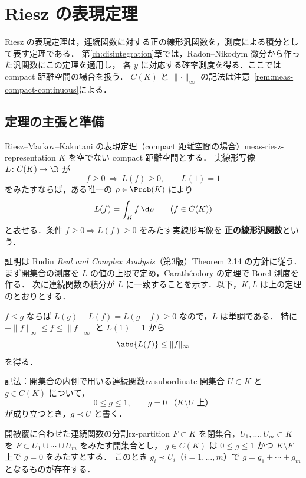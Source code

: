 \chapter{Riesz の表現定理}
\label{ch:riesz-representation}

Riesz の表現定理は，連続関数に対する正の線形汎関数を，測度による積分として表す定理である．
第\ref{ch:disintegration}章では，Radon--Nikodym 微分から作った汎関数にこの定理を適用し，
各 $y$ に対応する確率測度を得る．ここでは compact 距離空間の場合を扱う．
$C(K)$ と $\lVert\cdot\rVert_\infty$ の記法は注意~\ref{rem:meas-compact-continuous}による．

\section{定理の主張と準備}

\begin{theorem}{Riesz--Markov--Kakutani の表現定理（compact 距離空間の場合）}{meas-riesz-representation}
  $K$ を空でない compact 距離空間とする．
  実線形写像 $L\colon C(K)\to\R$ が
  \[
    f\geq0\ \Longrightarrow\ L(f)\geq0,\qquad L(1)=1
  \]
  をみたすならば，ある唯一の $\rho\in\Prob(K)$ により
  \[
    L(f)=\int_Kf\,\d\rho\qquad(f\in C(K))
  \]
  と表せる．条件 $f\geq0\Rightarrow L(f)\geq0$ をみたす実線形写像を
  \textbf{正の線形汎関数}という．
\end{theorem}

証明は Rudin \emph{Real and Complex Analysis}（第3版）Theorem 2.14 の方針に従う．
まず開集合の測度を $L$ の値の上限で定め，Carathéodory の定理で Borel 測度を作る．
次に連続関数の積分が $L$ に一致することを示す．以下，$K,L$ は上の定理のとおりとする．

$f\leq g$ ならば $L(g)-L(f)=L(g-f)\geq0$ なので，$L$ は単調である．
特に $-\lVert f\rVert_\infty\leq f\leq\lVert f\rVert_\infty$ と $L(1)=1$ から
\[
  \abs{L(f)}\leq\lVert f\rVert_\infty
\]
を得る．

\begin{remark}{記法：開集合の内側で用いる連続関数}{rz-subordinate}
  開集合 $U\subset K$ と $g\in C(K)$ について，
  \[
    0\leq g\leq1,\qquad g=0\ \text{（$K\setminus U$ 上）}
  \]
  が成り立つとき，$g\prec U$ と書く．
\end{remark}

\begin{lemma}{開被覆に合わせた連続関数の分割}{rz-partition}
  $F\subset K$ を閉集合，$U_1,\dots,U_m\subset K$ を $F\subset U_1\cup\cdots\cup U_m$ をみたす開集合とし，
  $g\in C(K)$ は $0\leq g\leq1$ かつ $K\setminus F$ 上で $g=0$ をみたすとする．
  このとき $g_i\prec U_i$（$i=1,\dots,m$）で $g=g_1+\cdots+g_m$ となるものが存在する．
\end{lemma}

